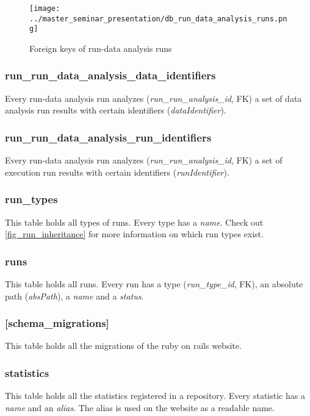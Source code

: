 \begin{figure}[hbtp]
\caption{Foreign keys of run-data analysis runs}
\label{fig_run_data_analysis_runs_foreign_keys}
\centering
\texttt{[image: ../master\_seminar\_presentation/db\_run\_data\_analysis\_runs.png]}
\end{figure} 
	
	\subsubsection{run\_run\_data\_analysis\_data\_identifiers}
	Every run-data analysis run analyzes (\textit{run\_run\_analysis\_id}, FK) a set of data analysis run results with certain identifiers (\textit{dataIdentifier}).
	
	\subsubsection{run\_run\_data\_analysis\_run\_identifiers}
	Every run-data analysis run analyzes (\textit{run\_run\_analysis\_id}, FK) a set of execution run results with certain identifiers (\textit{runIdentifier}).
	
	\subsubsection{run\_types}
	This table holds all types of runs. Every type has a \textit{name}. Check out \ref{fig_run_inheritance} for more information on which run types exist.
	
	\subsubsection{runs}
	This table holds all runs. Every run has a type (\textit{run\_type\_id}, FK), an absolute path (\textit{absPath}), a \textit{name} and a \textit{status}.
	
	\subsubsection{[schema\_migrations]}
	This table holds all the migrations of the ruby on rails website.
	
	\subsubsection{statistics}
	This table holds all the statistics registered in a repository. Every statistic has a \textit{name} and an \textit{alias}. The alias is used on the website as a readable name.
	
